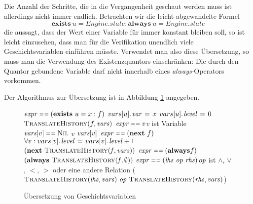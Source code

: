 Die Anzahl der Schritte, die in die Vergangenheit geschaut werden muss ist allerdings nicht immer endlich.
Betrachten wir die leicht abgewandelte Formel
\[ \textbf{exists}\ u = \mathit{Engine}.\mathit{state} : \textbf{always}\ u = \mathit{Engine}.\mathit{state} \]
die aussagt, dass der Wert einer Variable für immer konstant bleiben soll, so ist leicht einzusehen, dass man für die Verifikation unendlich viele Geschichtsvariablen einführen müsste.
Verwendet man also diese Übersetzung, so muss man die Verwendung des Existenzquantors einschränken:
Die durch den Quantor gebundene Variable darf nicht innerhalb eines \emph{always}-Operators vorkommen.

Der Algorithmus zur Übersetzung ist in Abbildung \ref{fig:translate_history} angegeben.
\begin{figure}[h]
\begin{codebox}
\li \If $\id{expr}\isequal (\textbf{exists}\ u=x : f)$ \Then
\li $\attrib{vars[u]}{var}\gets x$
\li $\attrib{vars[u]}{level}\gets 0$
\li \Return $\proc{TranslateHistory}(f,\id{vars})$
\li \ElseIf $\id{expr}\isequal v$\>\>\>\>\>\>\Comment$v$ ist Variable
\Then
\li \If $\id{vars}[v]\isequal\const{Nil}$\Then
\li \Return $v$
\li \Else \Return $\id{vars}[v]$
\End
\li \ElseIf $\id{expr}\isequal (\textbf{next}\ f)$\Then
\li $\forall v: \attrib{vars[v]}{level}\gets \attrib{vars[v]}{level}+1$
\li \Return $(\textbf{next}\ \proc{TranslateHistory}(\id{f},\id{vars}))$
\li \ElseIf $\id{expr}\isequal (\textbf{always} f)$\Then
\li \Return $(\textbf{always}\ \proc{TranslateHistory}(\id{f},\emptyset))$
\li \ElseIf $\id{expr}\isequal (\id{lhs}\ \id{op}\ \id{rhs})$\>\>\>\>\>\>\Comment $\id{op}$ ist $\land$, $\lor$, $<$, $>$ oder eine andere Relation
\Then
\li \Return ($\proc{TranslateHistory}(\id{lhs},\id{vars})\ \id{op}\ \proc{TranslateHistory}(\id{rhs},\id{vars})$)
\End
\end{codebox}
\caption{Übersetzung von Geschichtsvariablen}
\label{fig:translate_history}
\end{figure}